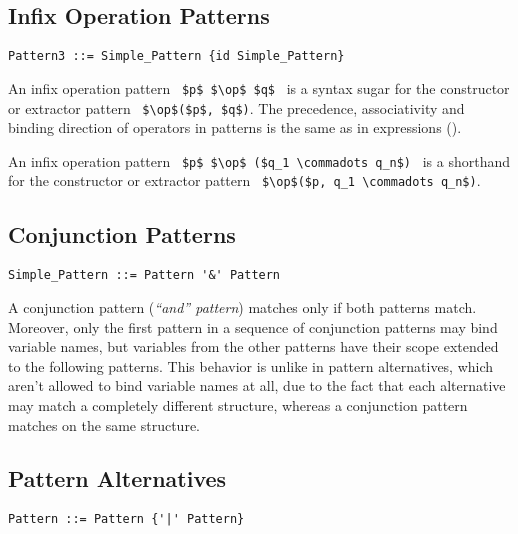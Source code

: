 \subsection{Infix Operation Patterns}
\label{sec:infix-operation-patterns}

\syntax\begin{lstlisting}
Pattern3 ::= Simple_Pattern {id Simple_Pattern}
\end{lstlisting}

An infix operation pattern ~\lstinline!$p$ $\op$ $q$!~ is a syntax sugar for the constructor or extractor pattern ~\lstinline!$\op$($p$, $q$)!. The precedence, associativity and binding direction of operators in patterns is the same as in expressions ().

An infix operation pattern ~\lstinline!$p$ $\op$ ($q_1 \commadots q_n$)!~ is a shorthand for the constructor or extractor pattern ~\lstinline!$\op$($p, q_1 \commadots q_n$)!.





\subsection{Conjunction Patterns}
\label{sec:conjunction-patterns}

\syntax\begin{lstlisting}
Simple_Pattern ::= Pattern '&' Pattern
\end{lstlisting}

A conjunction pattern ({\em {\normalfont ``and''} pattern}) matches only if both patterns match. Moreover, only the first pattern in a sequence of conjunction patterns may bind variable names, but variables from the other patterns have their scope extended to the following patterns. This behavior is unlike in pattern alternatives, which aren't allowed to bind variable names at all, due to the fact that each alternative may match a completely different structure, whereas a conjunction pattern matches on the same structure. 





\subsection{Pattern Alternatives}
\label{sec:pattern-alternatives}

\syntax\begin{lstlisting}
Pattern ::= Pattern {'|' Pattern}
\end{lstlisting}

